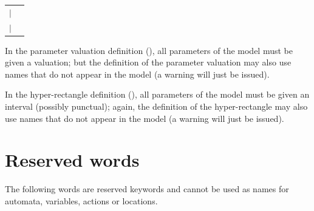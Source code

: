 \begin{longtable}{p{1em} p{}}

	$|$ & \styleIMI{;}   \\
	$|$ & \emptystring{} \\
\end{longtable}





\begin{remark}
	In the parameter valuation definition (), all parameters of the model must be given a valuation; but the definition of the parameter valuation may also use names that do not appear in the model (a warning will just be issued).
\end{remark}

\begin{remark}
	In the hyper-rectangle definition (), all parameters of the model must be given an interval (possibly punctual); again, the definition of the hyper-rectangle may also use names that do not appear in the model (a warning will just be issued).
\end{remark}





\section{Reserved words}

The following words are reserved keywords and cannot be used as names for automata, variables, actions or locations.

